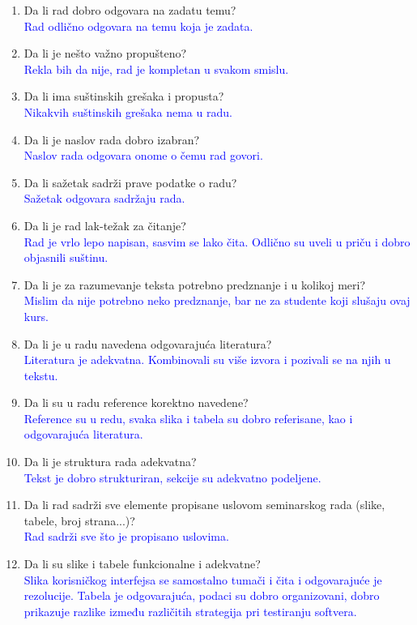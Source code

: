 \documentclass[a4paper]{report}
\newcommand{\odgovor}[1]{\textcolor{blue}{#1}}
\begin{document}
\begin{enumerate}
\item Da li rad dobro odgovara na zadatu temu?\\
\odgovor {Rad odlično odgovara na temu koja je zadata.}

\item Da li je nešto važno propušteno?\\
\odgovor {Rekla bih da nije, rad je kompletan u svakom smislu.}

\item Da li ima suštinskih grešaka i propusta? \\
\odgovor {Nikakvih suštinskih grešaka nema u radu.}

\item Da li je naslov rada dobro izabran?\\
\odgovor {Naslov rada odgovara onome o čemu rad govori. }

\item Da li sažetak sadrži prave podatke o radu?\\
\odgovor {Sažetak odgovara sadržaju rada.}

\item Da li je rad lak-težak za čitanje?\\
\odgovor {Rad je vrlo lepo napisan, sasvim se lako čita. Odlično su uveli u priču i dobro objasnili suštinu. }

\item Da li je za razumevanje teksta potrebno predznanje i u kolikoj meri? \\
\odgovor {Mislim da nije potrebno neko predznanje, bar ne za studente koji slušaju ovaj kurs. }

\item Da li je u radu navedena odgovarajuća literatura? \\
\odgovor {Literatura je adekvatna. Kombinovali su više izvora i pozivali se na njih u tekstu.}

\item Da li su u radu reference korektno navedene?\\
\odgovor {Reference su u redu, svaka slika i tabela su dobro referisane, kao i odgovarajuća literatura. }

\item Da li je struktura rada adekvatna?\\
\odgovor {Tekst je dobro strukturiran, sekcije su adekvatno podeljene. }

\item Da li rad sadrži sve elemente propisane uslovom seminarskog rada (slike, tabele, broj strana...)?\\
\odgovor {Rad sadrži sve što je propisano uslovima.}

\item Da li su slike i tabele funkcionalne i adekvatne?\\
\odgovor {Slika korisničkog interfejsa se samostalno tumači i čita i  odgovarajuće je rezolucije. Tabela je odgovarajuća, podaci su dobro organizovani, dobro prikazuje razlike između različitih strategija pri testiranju softvera. }

\end{enumerate}
\end{document}

